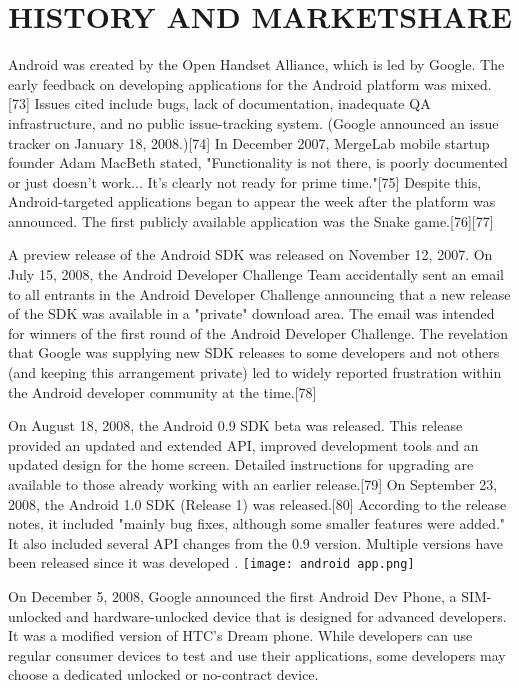 \documentclass{fisatproject}
\begin{document}
\chapter{HISTORY AND MARKETSHARE}
Android was created by the Open Handset Alliance, which is led by Google. The early feedback on developing applications for the Android platform was mixed.[73] Issues cited include bugs, lack of documentation, inadequate QA infrastructure, and no public issue-tracking system. (Google announced an issue tracker on January 18, 2008.)[74] In December 2007, MergeLab mobile startup founder Adam MacBeth stated, "Functionality is not there, is poorly documented or just doesn't work... It's clearly not ready for prime time."[75] Despite this, Android-targeted applications began to appear the week after the platform was announced. The first publicly available application was the Snake game.[76][77]

A preview release of the Android SDK was released on November 12, 2007. On July 15, 2008, the Android Developer Challenge Team accidentally sent an email to all entrants in the Android Developer Challenge announcing that a new release of the SDK was available in a "private" download area. The email was intended for winners of the first round of the Android Developer Challenge. The revelation that Google was supplying new SDK releases to some developers and not others (and keeping this arrangement private) led to widely reported frustration within the Android developer community at the time.[78]

On August 18, 2008, the Android 0.9 SDK beta was released. This release provided an updated and extended API, improved development tools and an updated design for the home screen. Detailed instructions for upgrading are available to those already working with an earlier release.[79] On September 23, 2008, the Android 1.0 SDK (Release 1) was released.[80] According to the release notes, it included "mainly bug fixes, although some smaller features were added." It also included several API changes from the 0.9 version. Multiple versions have been released since it was developed .
\texttt{[image: android app.png]}

On December 5, 2008, Google announced the first Android Dev Phone, a SIM-unlocked and hardware-unlocked device that is designed for advanced developers. It was a modified version of HTC's Dream phone. While developers can use regular consumer devices to test and use their applications, some developers may choose a dedicated unlocked or no-contract device.
\end{document}
